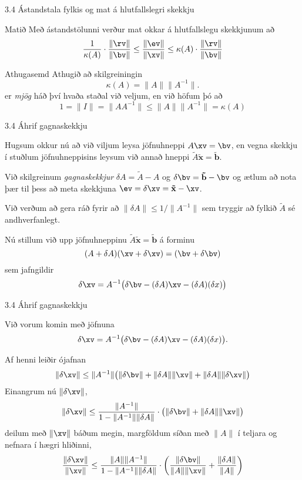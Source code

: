 \begin{frame}{3.4 Ástandstala fylkis og mat á hlutfallslegri skekkju} 

\begin{block}{Matið}
Með ástandstölunni verður mat okkar á hlutfallslegu skekkjunum að
$$
\dfrac 1{\kappa(A)}\cdot \dfrac{ \|\rv\|}{\|\bv\|} 
\leq \dfrac{\|\ev\|}{\|\xv\|} \leq 
\kappa(A)\cdot \dfrac{\|\rv\|}{\|\bv\|}
$$
\end{block}

\pause

\begin{block}{Athugasemd}
Athugið að skilgreiningin 
$$
\kappa(A)=\|A\|\|A^{-1}\|.
$$
er {\it mjög}  háð því hvaða staðal við veljum,
\pause
en við höfum þó að
$$
1=\|I\|=\|AA^{-1}\|\leq \|A\|\|A^{-1}\|=\kappa(A) 
$$
\end{block}
\end{frame}

\begin{frame}{3.4 Áhrif gagnaskekkju} 

Hugsum okkur nú að við viljum leysa jöfnuhneppi $A\xv=\bv$, en vegna
skekkju í stuðlum jöfnuhneppisins  leysum við annað hneppi
$\tilde A\mathbf {\tilde x}=\mathbf{\tilde b}$.

\pause
\smallskip
Við skilgreinum {\it gagnaskekkjur} $\delta A=\tilde A-A$ og
$\delta\bv=\mathbf{\tilde b}-\bv$ og ætlum að nota þær til þess að
meta skekkjuna $\ev=\delta\xv=\mathbf{\tilde x}-\xv$.

\pause
\smallskip
Við verðum að gera ráð fyrir að $ \|\delta A\|\leq 1/\|A^{-1}\|$ sem
tryggir að fylkið $\tilde A$ sé andhverfanlegt.

\pause
\smallskip
Nú stillum við upp jöfnuhneppinu 
$\tilde A\mathbf{\tilde x}=\mathbf{\tilde  b}$ á forminu
$$
(A+\delta A)(\xv+\delta \xv)=(\bv+\delta\bv)
$$
sem jafngildir
$$
\delta\xv=A^{-1}\big(\delta\bv-(\delta A)\xv-(\delta A)(\delta x)\big)
$$
\end{frame}

\begin{frame}{3.4 Áhrif gagnaskekkju} 

Við vorum komin með jöfnuna
$$
\delta\xv=A^{-1}\big(\delta\bv-(\delta A)\xv-(\delta A)(\delta x)\big).
$$

\pause
\smallskip
Af henni leiðir ójafnan
$$
\|\delta\xv\|\leq 
\|A^{-1}\|\big(\|\delta\bv\|+\|\delta A\|\|\xv\|+\|\delta A\|\|\delta \xv\|\big)
$$
Einangrum nú $\|\delta \xv\|$,
$$
\|\delta\xv\|\leq 
\dfrac{\|A^{-1}\|}{1-\|A^{-1}\|\|\delta A\|}\cdot 
\big(\|\delta\bv\|+\|\delta A\|\|\xv\|\big)
$$\pause
deilum með $\|\xv\|$ báðum megin,  margföldum síðan með $\|A\|$ í teljara
og nefnara í hægri hliðinni,
$$
\dfrac{\|\delta\xv\|} {\|\xv\|}\leq 
\dfrac{\|A\|\|A^{-1}\|}{1-\|A^{-1}\|\|\delta A\|}\cdot 
\bigg(\dfrac{\|\delta\bv\|}{\|A\|\|\xv\|}+
\dfrac{\|\delta A\|}{\|A\|}\bigg)
$$
\end{frame}


